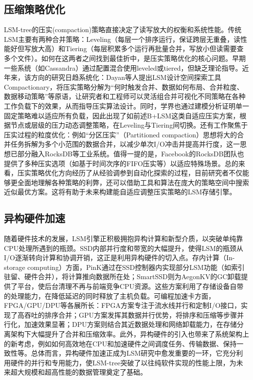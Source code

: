 \documentclass[lang=cn,11pt,a4paper]{elegantpaper}
\begin{document}
\subsection{压缩策略优化}
LSM-tree的压实(compaction)策略直接决定了读写放大的权衡和系统性能。传统LSM主要有两种合并策略：Leveling（每层一个排序运行，保证跨层无重叠，读性能好但写放大高）和Tiering（每层积累多个运行再批量合并，写放小但读需要查多个文件）。如何在这两者之间找到最佳折中，是压实策略优化的核心问题。早期一些系统（如Cassandra）通过配置混合使用leveled或tiered，但缺乏理论指导。近年来，该方向的研究日趋系统化：Dayan等人提出LSM设计空间探索工具Compactionary，将压实策略分解为“何时触发合并、数据如何布局、合并粒度、数据移动策略”等原语，让研究者和工程师可以灵活组合并可视化不同策略在各种工作负载下的效果，从而指导压实算法设计。同时，学界也通过建模分析证明单一固定策略难以适应所有负载，因此出现了如前述B+LSM这类自适应压实方案，根据节点或层级的压力动态调整策略，在Leveling与Tiering间切换。还有工作聚焦于压实过程的粒度优化：例如“分区压实”（Partitioned compaction）思想将大的合并任务拆解为多个小范围的数据合并，以减少单次I/O冲击并提高并行度，这一思想已部分融入RocksDB等工业系统。值得一提的是，Facebook的RocksDB团队也提供了多种压实选项（如基于时间次序的FIFO压实等）以适应特殊场景。总的来看，压实策略优化方向经历了从经验调参到自动化探索的过程，目前研究者不仅能够更全面地理解各种策略的利弊，还可以借助工具和算法在庞大的策略空间中搜索近似最优方案。这将有助于未来构建能自适应调整压实策略的LSM存储引擎。

\subsection{异构硬件加速}
随着硬件技术的发展，LSM引擎正积极拥抱异构计算和新型介质，以突破单纯靠CPU处理所遇到的瓶颈。SSD内部并行度和带宽的大幅提升，使得LSM的瓶颈从I/O逐渐转向计算和协调开销，这正是利用异构硬件的切入点。存内计算（In-storage computing）方面，PinK通过在SSD控制器内实现部分LSM功能（如索引驻留、硬件合并），将计算推向数据所在处；SmartSSD则为AegonKV的GC卸载提供了平台，使后台清理不再与前端竞争CPU资源。这些方案利用了存储设备自带的处理能力，在降低延迟的同时释放了主机负载。可编程加速卡方面，FPGA/GPU/DPU等各展所长：FPGA方案专注于流水线并行和定制I/O接口，实现了高吞吐的排序合并；GPU方案发挥其数据并行优势，将排序和压缩等步骤并行化，加速效果显著；DPU方案则结合其近数据处理和网络卸载能力，在存储分离架构下大幅提升了合并和压缩效率。此外，异构硬件的引入也带来了系统架构上的新考虑，例如如何高效地在CPU和加速硬件之间调度任务、传输数据、保持一致性等。总体而言，异构硬件加速正成为LSM研究中愈发重要的一环，它充分利用硬件的并行和专用能力，使LSM-tree突破了以往纯软件实现的性能上限，为未来超大规模和超高性能的数据管理奠定了基础。
\end{document}
